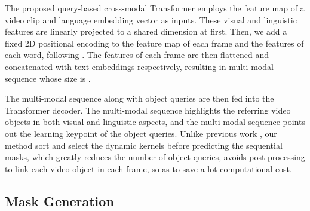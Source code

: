 \documentclass[sigconf]{acmart}
\begin{document}








The proposed query-based cross-modal Transformer employs the feature map of a video clip  and language embedding vector  as inputs.
These visual and linguistic features are linearly projected to a shared dimension  at first. Then, we add a fixed 2D positional encoding to the feature map of each frame and the features of each word, following \cite{botach2021end}. The features of each frame are then flattened and concatenated with text embeddings respectively, resulting in multi-modal sequence whose size is .


The multi-modal sequence along with  object queries are then fed into the Transformer decoder. The multi-modal sequence highlights the referring video objects in both visual and linguistic aspects, and the multi-modal sequence points out the learning keypoint of the object queries. Unlike previous work \cite{botach2021end}, our method sort and select the dynamic kernels before predicting the sequential masks, which greatly reduces the number of object queries, avoids post-processing to link each video object in each frame, so as to save a lot computational cost. 









\subsection{Mask Generation}
\end{document}

